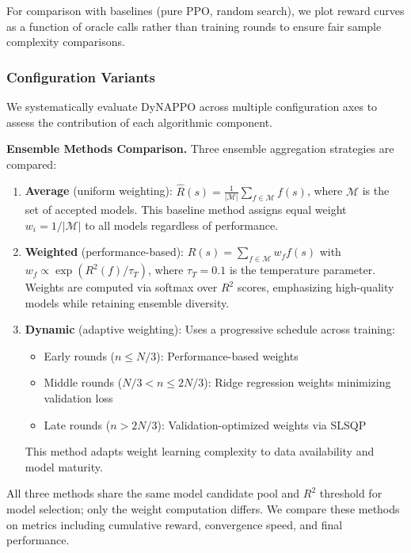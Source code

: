 For comparison with baselines (pure PPO, random search), we plot reward curves as a function of oracle calls rather than training rounds to ensure fair sample complexity comparisons.

\subsubsection{Configuration Variants}

We systematically evaluate DyNAPPO across multiple configuration axes to assess the contribution of each algorithmic component.

\textbf{Ensemble Methods Comparison.} Three ensemble aggregation strategies are compared:
\begin{enumerate}
    \item \textbf{Average} (uniform weighting): $\hat{R}(s) = \frac{1}{|\mathcal{M}|}\sum_{f \in \mathcal{M}} f(s)$, where $\mathcal{M}$ is the set of accepted models. This baseline method assigns equal weight $w_i = 1/|\mathcal{M}|$ to all models regardless of performance.

    \item \textbf{Weighted} (performance-based): $\hat{R}(s) = \sum_{f \in \mathcal{M}} w_f f(s)$ with $w_f \propto \exp(R^2(f) / \tau_T)$, where $\tau_T = 0.1$ is the temperature parameter. Weights are computed via softmax over $R^2$ scores, emphasizing high-quality models while retaining ensemble diversity.

    \item \textbf{Dynamic} (adaptive weighting): Uses a progressive schedule across training:
    \begin{itemize}
        \item Early rounds ($n \leq N/3$): Performance-based weights
        \item Middle rounds ($N/3 < n \leq 2N/3$): Ridge regression weights minimizing validation loss
        \item Late rounds ($n > 2N/3$): Validation-optimized weights via SLSQP
    \end{itemize}
    This method adapts weight learning complexity to data availability and model maturity.
\end{enumerate}

All three methods share the same model candidate pool and $R^2$ threshold for model selection; only the weight computation differs. We compare these methods on metrics including cumulative reward, convergence speed, and final performance.

